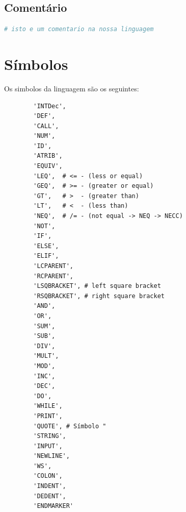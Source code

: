 \documentclass[11pt,a4paper]{report}
\begin{document}
    \subsection{Comentário}
    \begin{lstlisting}[language=Python]
        # isto e um comentario na nossa linguagem
    \end{lstlisting}

    \section{Símbolos}
    Os simbolos da linguagem são os seguintes:
    \begin{verbatim}
        'INTDec',
        'DEF',
        'CALL',
        'NUM',
        'ID',
        'ATRIB',
        'EQUIV',
        'LEQ',  # <= - (less or equal)
        'GEQ',  # >= - (greater or equal)
        'GT',   # >  - (greater than)
        'LT',   # <  - (less than)
        'NEQ',  # /= - (not equal -> NEQ -> NECC)
        'NOT',
        'IF',
        'ELSE',
        'ELIF',
        'LCPARENT',
        'RCPARENT',
        'LSQBRACKET', # left square bracket
        'RSQBRACKET', # right square bracket
        'AND',
        'OR',
        'SUM',
        'SUB',
        'DIV',
        'MULT',
        'MOD',
        'INC',
        'DEC',
        'DO',
        'WHILE',
        'PRINT',
        'QUOTE', # Símbolo "
        'STRING',
        'INPUT',
        'NEWLINE',
        'WS',
        'COLON',
        'INDENT',
        'DEDENT',
        'ENDMARKER'
    \end{verbatim}
\end{document}
